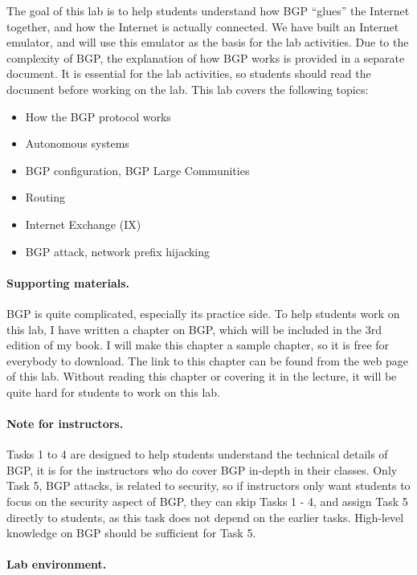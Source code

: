 The goal of this lab is to help students understand how
BGP ``glues'' the Internet together, and how the Internet is actually
connected. We have built an Internet emulator, and will 
use this emulator as the basis for the lab activities. Due to the 
complexity of BGP, the explanation of how BGP works is provided
in a separate document. It is essential for the lab activities, 
so students should read
the document before working on the lab. 
This lab covers the following topics:
\begin{itemize}[noitemsep]
\item How the BGP protocol works
\item Autonomous systems
\item BGP configuration, BGP Large Communities 
\item Routing 
\item Internet Exchange (IX)
\item BGP attack, network prefix hijacking
\end{itemize}


\paragraph{Supporting materials.}
BGP is quite complicated, especially its practice side.
To help students work on this lab, I have written a chapter on
BGP, which will be included in the 3rd edition of my book.
I will make this chapter a sample chapter, so it is free
for everybody to download. 
The link to this chapter can be found from the web page of this lab.
Without reading this chapter
or covering it in the lecture, it will be quite hard 
for students to work on this lab. 


\paragraph{Note for instructors.} 
Tasks 1 to 4 are designed to help students understand the technical 
details of BGP, it is for the instructors who do cover BGP in-depth in
their classes. Only Task 5, BGP attacks, is related to security,
so if instructors only want students to
focus on the security aspect of BGP, they can skip Tasks 1 - 4, and 
assign Task 5 directly to students, as this task
does not depend on the earlier tasks. 
High-level knowledge on BGP should be sufficient for Task 5.

\paragraph{Lab environment.} 
\seedenvironmentB
\nodependency



